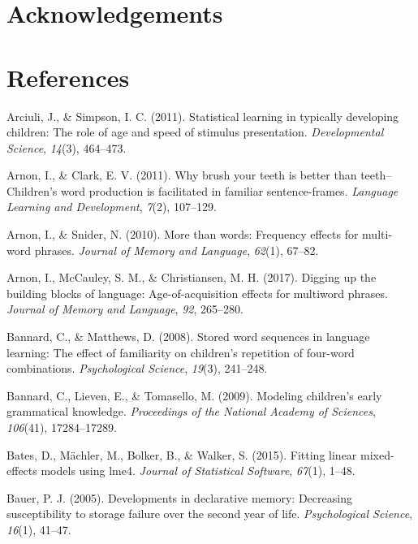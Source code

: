 \documentclass[man,mask,floatsintext]{apa6}
\begin{document}
\section{Acknowledgements}\label{acknowledgements}

\newpage

\section{References}\label{references}

\begingroup
\setlength{\parindent}{-0.5in} \setlength{\leftskip}{0.5in}

\hypertarget{refs}{}
\hypertarget{ref-arciuli2011statistical}{}
Arciuli, J., \& Simpson, I. C. (2011). Statistical learning in typically
developing children: The role of age and speed of stimulus presentation.
\emph{Developmental Science}, \emph{14}(3), 464--473.

\hypertarget{ref-arnon2011brush}{}
Arnon, I., \& Clark, E. V. (2011). Why brush your teeth is better than
teeth--Children's word production is facilitated in familiar
sentence-frames. \emph{Language Learning and Development}, \emph{7}(2),
107--129.

\hypertarget{ref-arnon2010more}{}
Arnon, I., \& Snider, N. (2010). More than words: Frequency effects for
multi-word phrases. \emph{Journal of Memory and Language}, \emph{62}(1),
67--82.

\hypertarget{ref-arnon2017}{}
Arnon, I., McCauley, S. M., \& Christiansen, M. H. (2017). Digging up
the building blocks of language: Age-of-acquisition effects for
multiword phrases. \emph{Journal of Memory and Language}, \emph{92},
265--280.

\hypertarget{ref-bannard2008stored}{}
Bannard, C., \& Matthews, D. (2008). Stored word sequences in language
learning: The effect of familiarity on children's repetition of
four-word combinations. \emph{Psychological Science}, \emph{19}(3),
241--248.

\hypertarget{ref-bannard2009modeling}{}
Bannard, C., Lieven, E., \& Tomasello, M. (2009). Modeling children's
early grammatical knowledge. \emph{Proceedings of the National Academy
of Sciences}, \emph{106}(41), 17284--17289.

\hypertarget{ref-lme4}{}
Bates, D., Mächler, M., Bolker, B., \& Walker, S. (2015). Fitting linear
mixed-effects models using lme4. \emph{Journal of Statistical Software},
\emph{67}(1), 1--48.

\hypertarget{ref-bauer2005developments}{}
Bauer, P. J. (2005). Developments in declarative memory: Decreasing
susceptibility to storage failure over the second year of life.
\emph{Psychological Science}, \emph{16}(1), 41--47.
\end{document}
